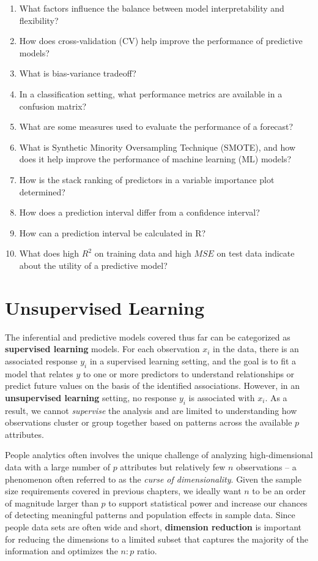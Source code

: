 \documentclass[
]{book}
\begin{document}
\begin{enumerate}
\def\labelenumi{\arabic{enumi}.}
\item
  What factors influence the balance between model interpretability and flexibility?
\item
  How does cross-validation (CV) help improve the performance of predictive models?
\item
  What is bias-variance tradeoff?
\item
  In a classification setting, what performance metrics are available in a confusion matrix?
\item
  What are some measures used to evaluate the performance of a forecast?
\item
  What is Synthetic Minority Oversampling Technique (SMOTE), and how does it help improve the performance of machine learning (ML) models?
\item
  How is the stack ranking of predictors in a variable importance plot determined?
\item
  How does a prediction interval differ from a confidence interval?
\item
  How can a prediction interval be calculated in R?
\item
  What does high \(R^2\) on training data and high \(MSE\) on test data indicate about the utility of a predictive model?
\end{enumerate}

\hypertarget{unsup-lrn}{%
\chapter{Unsupervised Learning}\label{unsup-lrn}}

The inferential and predictive models covered thus far can be categorized as \textbf{supervised learning} models. For each observation \(x_i\) in the data, there is an associated response \(y_i\) in a supervised learning setting, and the goal is to fit a model that relates \(y\) to one or more predictors to understand relationships or predict future values on the basis of the identified associations. However, in an \textbf{unsupervised learning} setting, no response \(y_i\) is associated with \(x_i\). As a result, we cannot \emph{supervise} the analysis and are limited to understanding how observations cluster or group together based on patterns across the available \(p\) attributes.

People analytics often involves the unique challenge of analyzing high-dimensional data with a large number of \(p\) attributes but relatively few \(n\) observations -- a phenomenon often referred to as the \emph{curse of dimensionality}. Given the sample size requirements covered in previous chapters, we ideally want \(n\) to be an order of magnitude larger than \(p\) to support statistical power and increase our chances of detecting meaningful patterns and population effects in sample data. Since people data sets are often wide and short, \textbf{dimension reduction} is important for reducing the dimensions to a limited subset that captures the majority of the information and optimizes the \(n:p\) ratio.
\end{document}
